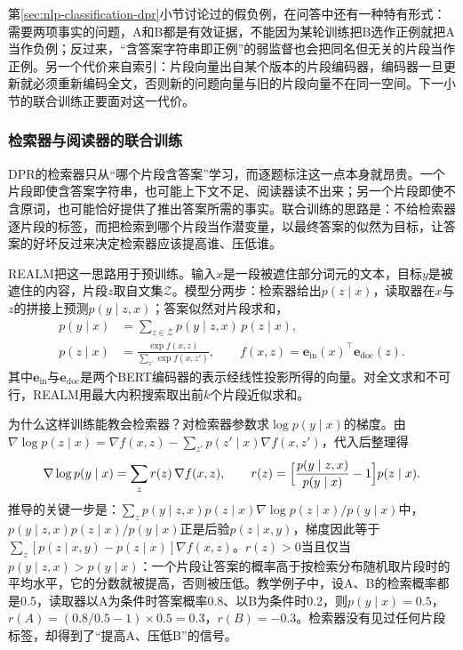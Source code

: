 第\ref{sec:nlp-classification-dpr}小节讨论过的假负例，在问答中还有一种特有形式：需要两项事实的问题，A和B都是有效证据，不能因为某轮训练把B选作正例就把A当作负例；反过来，“含答案字符串即正例”的弱监督也会把同名但无关的片段当作正例。另一个代价来自索引：片段向量出自某个版本的片段编码器，编码器一旦更新就必须重新编码全文，否则新的问题向量与旧的片段向量不在同一空间。下一小节的联合训练正要面对这一代价。

\subsubsection{检索器与阅读器的联合训练}
\label{sec:nlp-dialogue-joint-retriever}

DPR的检索器只从“哪个片段含答案”学习，而逐题标注这一点本身就昂贵。一个片段即使含答案字符串，也可能上下文不足、阅读器读不出来；另一个片段即使不含原词，也可能恰好提供了推出答案所需的事实。联合训练的思路是：不给检索器逐片段的标签，而把检索到哪个片段当作潜变量，以最终答案的似然为目标，让答案的好坏反过来决定检索器应该提高谁、压低谁。

REALM把这一思路用于预训练。输入$x$是一段被遮住部分词元的文本，目标$y$是被遮住的内容，片段$z$取自文集$\mathcal Z$。模型分两步：检索器给出$p(z\mid x)$，读取器在$x$与$z$的拼接上预测$p(y\mid z,x)$；答案似然对片段求和，
\begin{equation}
\begin{aligned}
  p(y\mid x)&=\sum_{z\in\mathcal Z}p(y\mid z,x)\,p(z\mid x),\\
  p(z\mid x)&=\frac{\exp f(x,z)}{\sum_{z'}\exp f(x,z')},\qquad
  f(x,z)=\bm e_{\mathrm{in}}(x)^{\top}\bm e_{\mathrm{doc}}(z).
\end{aligned}
  \label{eq:nlp-dialogue-realm}
\end{equation}
其中$\bm e_{\mathrm{in}}$与$\bm e_{\mathrm{doc}}$是两个BERT编码器的\code{[CLS]}表示经线性投影所得的向量。对全文求和不可行，REALM用最大内积搜索取出前$k$个片段近似求和。

为什么这样训练能教会检索器？对检索器参数求$\log p(y\mid x)$的梯度。由$\nabla\log p(z\mid x)=\nabla f(x,z)-\sum_{z'}p(z'\mid x)\nabla f(x,z')$，代入后整理得
\begin{equation}
  \nabla\log p(y\mid x)=\sum_{z}r(z)\,\nabla f(x,z),\qquad
  r(z)=\Bigl[\frac{p(y\mid z,x)}{p(y\mid x)}-1\Bigr]p(z\mid x).
  \label{eq:nlp-dialogue-realm-grad}
\end{equation}
推导的关键一步是：$\sum_z p(y\mid z,x)p(z\mid x)\nabla\log p(z\mid x)/p(y\mid x)$中，$p(y\mid z,x)p(z\mid x)/p(y\mid x)$正是后验$p(z\mid x,y)$，梯度因此等于$\sum_z[p(z\mid x,y)-p(z\mid x)]\nabla f(x,z)$。$r(z)>0$当且仅当$p(y\mid z,x)>p(y\mid x)$：一个片段让答案的概率高于按检索分布随机取片段时的平均水平，它的分数就被提高，否则被压低。教学例子中，设A、B的检索概率都是0.5，读取器以A为条件时答案概率0.8、以B为条件时0.2，则$p(y\mid x)=0.5$，$r(A)=(0.8/0.5-1)\times0.5=0.3$，$r(B)=-0.3$。检索器没有见过任何片段标签，却得到了“提高A、压低B”的信号。

